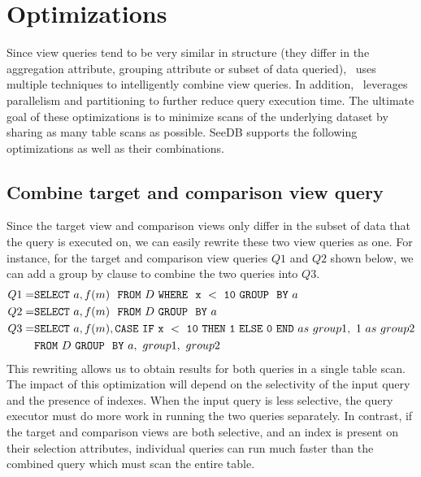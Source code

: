 \section{Optimizations} \label{sec:optimizations}
Since view queries
tend to be very similar in structure (they differ in the aggregation attribute,
grouping attribute or subset of data queried), \SeeDB\ uses multiple techniques
to intelligently combine view queries. In addition, \SeeDB\ leverages
parallelism and partitioning to further reduce query execution time. The
ultimate goal of these optimizations is to minimize scans of the underlying
dataset by sharing as many table scans as possible. SeeDB supports the following
optimizations as well as their combinations.

\subsection{Combine target and comparison view query}
\label{subsec:target_comparison_view}
Since the target view and comparison views only differ in the subset of data
that the query is executed on, we can easily rewrite these two view queries as
one. For instance, for the target and comparison view queries $Q1$ and $Q2$
shown below, we can add a group by clause to combine the two queries into $Q3$.
\begin{align*} 
Q1 = &{\tt SELECT \ } a, f(m) \ \ {\tt FROM} \  D\  {\tt WHERE \ \ x\ <\ 10\
GROUP \ \ BY} \ a \\
Q2 = &{\tt SELECT \ } a, f(m) \ \ {\tt FROM} \  D\  {\tt GROUP \ \ BY} \ a \\
Q3 = &{\tt SELECT \ } a, f(m), {\tt CASE\ IF\ x\ <\ 10\ THEN\ 1\ ELSE\ 0\
END}\ as\ group1,\ 1\ as\ group2\\ 
&{\tt FROM} \ D\ {\tt GROUP \ \ BY} \ a,\ group1,\ group2
\end{align*}
This rewriting allows us to obtain results for both queries in a single table
scan. The impact of this optimization will depend on the selectivity of the
input query and the presence of indexes. When the input query is less selective,
the query executor must do more work in running the two queries separately.
In contrast, if the target and comparison views are both selective, and an index
is present on their selection attributes, individual queries can run much
faster than the combined query which must scan the entire table.
  
